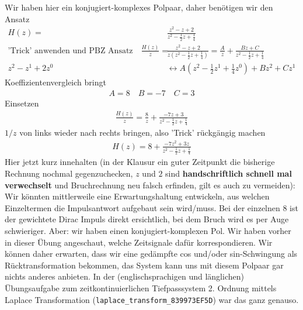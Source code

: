 \begin{Loesung}
Wir haben hier ein konjugiert-komplexes Polpaar, daher benötigen wir den
Ansatz
%
\begin{align}
H(z) =& \frac{z^2 - z + 2}{z^2 - \frac{1}{2}z + \frac{1}{4}}\\
\text{'Trick' anwenden und PBZ Ansatz}\quad\frac{H(z)}{z} =& \frac{z^2 - z +2}{z(z^2-\frac{1}{2}z +\frac{1}{4})} =
\frac{A}{z} + \frac{Bz+C}{z^2-\frac{1}{2}z +\frac{1}{4}}\\
z^2 - z^1 +2 z^0 & \leftrightarrow A(z^2-\frac{1}{2}z^1 +\frac{1}{4}z^0) + Bz^2 + Cz^1
\end{align}
Koeffizientenvergleich
bringt
\begin{align}
A = 8\quad B=-7\quad C=3
\end{align}
Einsetzen
\begin{align}
\frac{H(z)}{z} = \frac{8}{z} + \frac{-7 z + 3 }{z^2-\frac{1}{2}z +\frac{1}{4}}
\end{align}
$1/z$ von links wieder nach rechts bringen, also 'Trick' rückgängig machen
\begin{align}
H(z) = 8 + \frac{-7 z^2 + 3 z}{z^2-\frac{1}{2}z +\frac{1}{4}}
\end{align}
Hier jetzt kurz innehalten (in der Klausur ein guter Zeitpunkt die bisherige
Rechnung nochmal gegenzuchecken, $z$ und $2$ sind \textbf{handschriftlich schnell mal
verwechselt} und Bruchrechnung neu falsch erfinden, gilt es auch zu
vermeiden):
Wir könnten mittlerweile eine Erwartungshaltung entwickeln, aus welchen Einzeltermen
die Impulsantwort aufgebaut sein wird/muss. Bei der einzelnen 8 ist der gewichtete
Dirac Impuls direkt ersichtlich, bei dem Bruch wird es per Auge schwieriger.
Aber: wir haben einen konjugiert-komplexen Pol. Wir haben vorher in dieser Übung
angeschaut, welche Zeitsignale dafür korrespondieren.
Wir können daher erwarten, dass wir eine gedämpfte cos und/oder sin-Schwingung
als Rücktransformation bekommen, das System kann uns mit diesem Polpaar gar nichts
anderes anbieten. In der (englischsprachigen und länglichen) Übungsaufgabe
zum zeitkontinuierlichen Tiefpasssystem 2. Ordnung mittels Laplace Transformation
(\texttt{laplace\_transform\_839973EF5D})
war das ganz genauso.


\end{Loesung}
